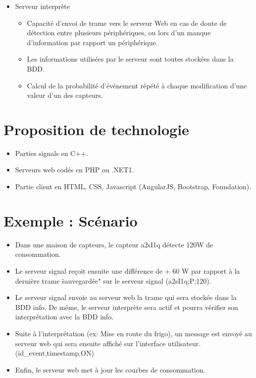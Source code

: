 \documentclass[10pt,a4paper]{article}
\begin{document}
\begin{itemize}
\item Serveur interprète
\begin{itemize}
  \item Capacité d'envoi de trame vers le serveur Web en cas de doute de détection entre plusieurs périphériques, ou lors d'un manque d'information par rapport un périphérique.
  \item Les informations utilisées par le serveur sont toutes stockées dans la BDD.
  \item Calcul de la probabilité d'événement répété à chaque modification d'une valeur d'un des capteurs.
\end{itemize}
\end{itemize}

\section{Proposition de technologie}
\begin{itemize}
\item Parties signals en C++.
\item Serveurs web codés en PHP ou .NET1.
\item Partie client en HTML, CSS, Javascript (AngularJS, Bootstrap, Foundation).
\end{itemize}

\section{Exemple : Scénario}
\begin{itemize}
  \item Dans une maison de capteurs, le capteur a2sI1q détecte 120W de consommation.
  \item Le serveur signal reçoit ensuite une différence de + 60 W par rapport à la dernière trame \"sauvegardée" sur le serveur signal (a2sI1q;P;120).
  \item Le serveur signal envoie au serveur web la trame qui sera stockée dans la BDD info. De même, le serveur interprète sera actif et pourra vérifier son interprétation avec la BDD info.
  \item Suite à l'interprétation (ex: Mise en route du frigo), un message est envoyé au serveur web qui sera ensuite affiché sur l'interface utilisateur.(id\_event,timestamp,ON)
  \item Enfin, le serveur web met à jour les courbes de consommation.
\end{itemize}
\end{document}
